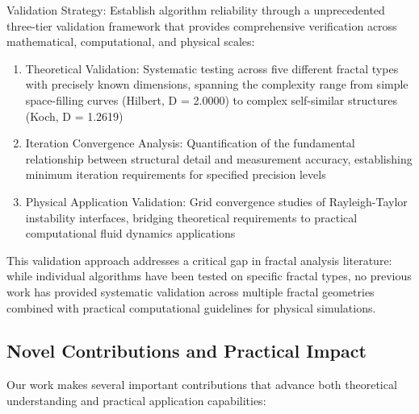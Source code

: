 \documentclass[preprint,12pt]{elsarticle}
\def\textbf#1{#1}%
\begin{document}
\textbf{Validation Strategy}: Establish algorithm reliability through a unprecedented three-tier validation framework that provides comprehensive verification across mathematical, computational, and physical scales:

\begin{enumerate}
\item \textbf{Theoretical Validation}: Systematic testing across five different fractal types with precisely known dimensions, spanning the complexity range from simple space-filling curves (Hilbert, D = 2.0000) to complex self-similar structures (Koch, D = 1.2619)

\item \textbf{Iteration Convergence Analysis}: Quantification of the fundamental relationship between structural detail and measurement accuracy, establishing minimum iteration requirements for specified precision levels

\item \textbf{Physical Application Validation}: Grid convergence studies of Rayleigh-Taylor instability interfaces, bridging theoretical requirements to practical computational fluid dynamics applications
\end{enumerate}

This validation approach addresses a critical gap in fractal analysis literature: while individual algorithms have been tested on specific fractal types, no previous work has provided systematic validation across multiple fractal geometries combined with practical computational guidelines for physical simulations.

\subsection{Novel Contributions and Practical Impact}

Our work makes several important contributions that advance both theoretical understanding and practical application capabilities:
\end{document}
